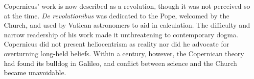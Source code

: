 % 


Copernicus' work is now described as a revolution, though it was not perceived so at the time. \emph{De revolutionibus} was dedicated to the Pope, welcomed by the Church, and used by Vatican astronomers to aid in calculation. The difficulty and narrow readership of his work made it unthreatening to contemporary dogma. Copernicus did not present heliocentrism as reality nor did he advocate for overturning long-held beliefs. Within a century, however, the Copernican theory had found its bulldog in Galileo, and conflict between science and the Church became unavoidable.




